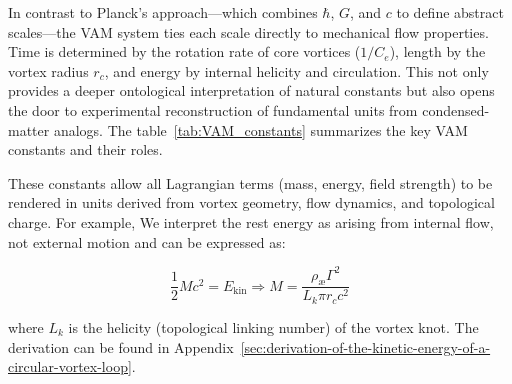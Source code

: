 In contrast to Planck's approach—which combines $\hbar$, $G$, and $c$ to define abstract scales—the VAM system ties each scale directly to mechanical flow properties. Time is determined by the rotation rate of core vortices ($1/C_e$), length by the vortex radius $r_c$, and energy by internal helicity and circulation. This not only provides a deeper ontological interpretation of natural constants but also opens the door to experimental reconstruction of fundamental units from condensed-matter analogs. The table~\ref{tab:VAM_constants} summarizes the key VAM constants and their roles.

These constants allow all Lagrangian terms (mass, energy, field strength) to be rendered in units derived from vortex geometry, flow dynamics, and topological charge. For example, We interpret the rest energy as arising from internal flow, not external motion and can be expressed as:


\begin{equation}
    \frac{1}{2} M c^2 = E_\text{kin} \Rightarrow M = \frac{\rho_\text{\ae} \Gamma^2}{L_k \pi r_c c^2}
\end{equation}


where $L_k$ is the helicity (topological linking number) of the vortex knot. The derivation can be found in Appendix~\ref{sec:derivation-of-the-kinetic-energy-of-a-circular-vortex-loop}.


